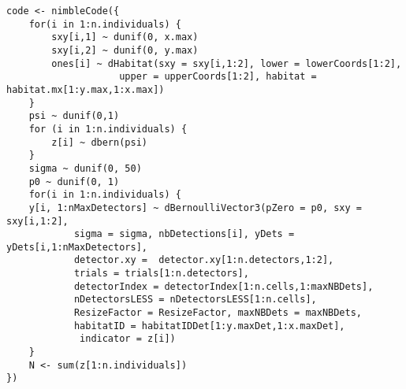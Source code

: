 \begin{singlespace}
\begin{small}
\begin{verbatim}
code <- nimbleCode({
    for(i in 1:n.individuals) {
        sxy[i,1] ~ dunif(0, x.max)
        sxy[i,2] ~ dunif(0, y.max)
        ones[i] ~ dHabitat(sxy = sxy[i,1:2], lower = lowerCoords[1:2], 
                    upper = upperCoords[1:2], habitat = habitat.mx[1:y.max,1:x.max])
    }
    psi ~ dunif(0,1)
    for (i in 1:n.individuals) {
        z[i] ~ dbern(psi)
    }
    sigma ~ dunif(0, 50)
    p0 ~ dunif(0, 1)
    for(i in 1:n.individuals) {
    y[i, 1:nMaxDetectors] ~ dBernoulliVector3(pZero = p0, sxy = sxy[i,1:2],
            sigma = sigma, nbDetections[i], yDets = yDets[i,1:nMaxDetectors],
            detector.xy =  detector.xy[1:n.detectors,1:2],
            trials = trials[1:n.detectors],
            detectorIndex = detectorIndex[1:n.cells,1:maxNBDets], 
            nDetectorsLESS = nDetectorsLESS[1:n.cells],  
            ResizeFactor = ResizeFactor, maxNBDets = maxNBDets, 
            habitatID = habitatIDDet[1:y.maxDet,1:x.maxDet],
             indicator = z[i])
    }
    N <- sum(z[1:n.individuals])
})

\end{verbatim}
\end{small}
\end{singlespace}


